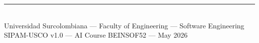 \documentclass[12pt,a4paper]{article}
\begin{document}
\vfill
\begin{center}
  {\color{vinotinto}\rule{0.5\linewidth}{0.8pt}}\\[0.3cm]
  {\small Universidad Surcolombiana — Faculty of Engineering — Software Engineering}\\
  {\small SIPAM-USCO v1.0 — AI Course BEINSOF52 — May 2026}
\end{center}
\end{document}
